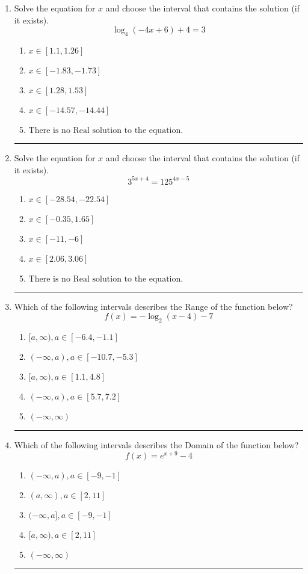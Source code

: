 \documentclass[14pt]{extbook}
\newcommand{\litem}[1]{\item#1\hspace*{-1cm}\rule{\textwidth}{0.4pt}}
\begin{document}
\begin{enumerate}
{\begin{enumerate}[label=\Alph*.]
\end{enumerate} }
\litem{
Solve the equation for $x$ and choose the interval that contains the solution (if it exists).\[ \log_{4}{(-4x+6)}+4 = 3 \]\begin{enumerate}[label=\Alph*.]
\item \( x \in [1.1, 1.26] \)
\item \( x \in [-1.83, -1.73] \)
\item \( x \in [1.28, 1.53] \)
\item \( x \in [-14.57, -14.44] \)
\item \( \text{There is no Real solution to the equation.} \)

\end{enumerate} }
\litem{
Solve the equation for $x$ and choose the interval that contains the solution (if it exists).\[ 3^{5x+4} = 125^{4x-5} \]\begin{enumerate}[label=\Alph*.]
\item \( x \in [-28.54, -22.54] \)
\item \( x \in [-0.35, 1.65] \)
\item \( x \in [-11, -6] \)
\item \( x \in [2.06, 3.06] \)
\item \( \text{There is no Real solution to the equation.} \)

\end{enumerate} }
\litem{
Which of the following intervals describes the Range of the function below?\[ f(x) = -\log_2{(x-4)}-7 \]\begin{enumerate}[label=\Alph*.]
\item \( [a, \infty), a \in [-6.4, -1.1] \)
\item \( (-\infty, a), a \in [-10.7, -5.3] \)
\item \( [a, \infty), a \in [1.1, 4.8] \)
\item \( (-\infty, a), a \in [5.7, 7.2] \)
\item \( (-\infty, \infty) \)

\end{enumerate} }
\litem{
Which of the following intervals describes the Domain of the function below?\[ f(x) = e^{x+9}-4 \]\begin{enumerate}[label=\Alph*.]
\item \( (-\infty, a), a \in [-9, -1] \)
\item \( (a, \infty), a \in [2, 11] \)
\item \( (-\infty, a], a \in [-9, -1] \)
\item \( [a, \infty), a \in [2, 11] \)
\item \( (-\infty, \infty) \)


\end{enumerate}}
\end{enumerate}
\end{document}
